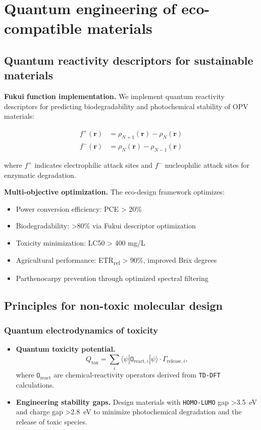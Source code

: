 \documentclass[12pt, a4paper]{article}
\begin{document}
\section{Quantum engineering of eco-compatible materials}
\label{sec:materials}

\subsection{Quantum reactivity descriptors for sustainable materials}

\textbf{Fukui function implementation.} We implement quantum reactivity descriptors for predicting biodegradability and photochemical stability of OPV materials:

\begin{align}
f^+(\mathbf{r}) &= \rho_{N+1}(\mathbf{r}) - \rho_N(\mathbf{r}) \\
f^-(\mathbf{r}) &= \rho_N(\mathbf{r}) - \rho_{N-1}(\mathbf{r})
\end{align}

where $f^+$ indicates electrophilic attack sites and $f^-$ nucleophilic attack sites for enzymatic degradation.

\textbf{Multi-objective optimization.} The eco-design framework optimizes:
\begin{itemize}
    \item Power conversion efficiency: PCE > 20\%
    \item Biodegradability: >80\% via Fukui descriptor optimization
    \item Toxicity minimization: LC50 > 400 mg/L
    \item Agricultural performance: ETR\textsubscript{rel} > 90\%, improved Brix degrees
    \item Parthenocarpy prevention through optimized spectral filtering
\end{itemize}

\subsection{Principles for non-toxic molecular design}

\subsubsection{Quantum electrodynamics of toxicity}

\begin{itemize}
    \item \textbf{Quantum toxicity potential.}
    \begin{equation}
    Q_{\text{tox}} = \sum_i \langle \psi | \mathtt{O}_{\text{react},i} | \psi \rangle \cdot \Gamma_{\text{release},i},
    \end{equation}
    where $\mathtt{O}_{\text{react}}$ are chemical-reactivity operators derived from \texttt{TD-DFT} calculations.
    
    \item \textbf{Engineering stability gaps.} Design materials with \texttt{HOMO-LUMO} gap \SI{>3.5}{\electronvolt} and charge gap \SI{>2.8}{\electronvolt} to minimize photochemical degradation and the release of toxic species.
\end{itemize}
\end{document}
